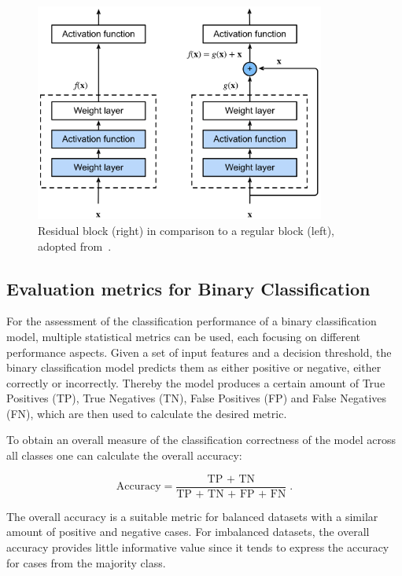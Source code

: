 \begin{figure}[ht]
  \centering
  \includegraphics[width=0.85\textwidth]{content/figures/residual_block.png}
  \caption{Residual block (right) in comparison to a regular block (left), adopted from~\cite{Zhang2023}.} 
  \label{fig:normal_and_residual_layer}
\end{figure}


\subsection{Evaluation metrics for Binary Classification}

For the assessment of the classification performance of a binary classification model,
multiple statistical metrics can be used, each focusing on different performance aspects.
Given a set of input features and a decision threshold, 
the binary classification model predicts them as either positive or negative, either correctly or incorrectly.
Thereby the model produces a certain amount of True Positives (TP), True Negatives (TN), False Positives (FP)
and False Negatives (FN), which are then used to calculate the desired metric.

To obtain an overall measure of the classification correctness of the model across all classes
one can calculate the overall accuracy:

\begin{equation}
  \label{eq:acc}
  \text{Accuracy} = \frac{\text{TP + TN}}{\text{TP + TN + FP + FN}} \;.
\end{equation}

The overall accuracy is a suitable metric for balanced datasets with a similar amount of positive and negative cases.
For imbalanced datasets, the overall accuracy provides little informative value 
since it tends to express the accuracy for cases from the majority class.

